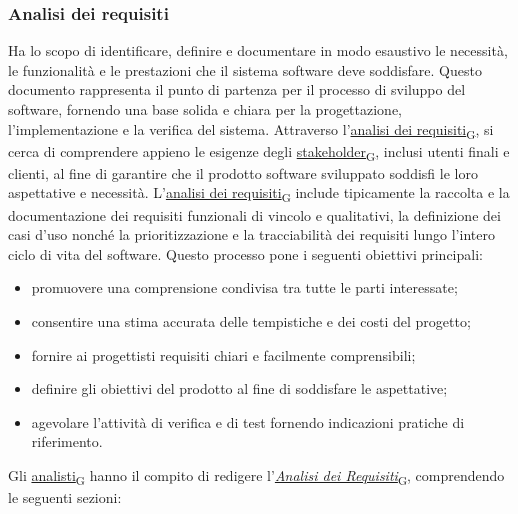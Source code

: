 \subsubsection{Analisi dei requisiti}
Ha lo scopo di identificare, definire e documentare in modo esaustivo le necessità, le funzionalità e le prestazioni che il sistema software deve soddisfare. Questo documento rappresenta il punto di partenza per il processo di sviluppo del software, fornendo una base solida e chiara per la progettazione, l'implementazione e la verifica del sistema. Attraverso l'\href{https://7last.github.io/docs/rtb/documentazione-interna/glossario\#analisi-dei-requisiti}{analisi dei requisiti\textsubscript{G}}, si cerca di comprendere appieno le esigenze degli \href{https://7last.github.io/docs/rtb/documentazione-interna/glossario\#stakeholder}{stakeholder\textsubscript{G}}, inclusi utenti finali e clienti, al fine di garantire che il prodotto software sviluppato soddisfi le loro aspettative e necessità. L'\href{https://7last.github.io/docs/rtb/documentazione-interna/glossario\#analisi-dei-requisiti}{analisi dei requisiti\textsubscript{G}} include tipicamente la raccolta e la documentazione dei requisiti funzionali di vincolo e qualitativi, la definizione dei casi d'uso nonché la prioritizzazione e la tracciabilità dei requisiti lungo l'intero ciclo di vita del software.
\newpage
{}
Questo processo pone i seguenti obiettivi principali:
\begin{itemize}
	\item promuovere una comprensione condivisa tra tutte le parti interessate;
	\item consentire una stima accurata delle tempistiche e dei costi del progetto;
	\item fornire ai progettisti requisiti chiari e facilmente comprensibili;
	\item definire gli obiettivi del prodotto al fine di soddisfare le aspettative;
	\item agevolare l'attività di verifica e di test fornendo indicazioni pratiche di riferimento.
\end{itemize}
Gli \href{https://7last.github.io/docs/rtb/documentazione-interna/glossario\#analista}{analisti\textsubscript{G}} hanno il compito di redigere l'\href{https://7last.github.io/docs/rtb/documentazione-interna/glossario\#analisi-dei-requisiti}{\textit{Analisi dei Requisiti}\textsubscript{G}}, comprendendo le seguenti sezioni:
